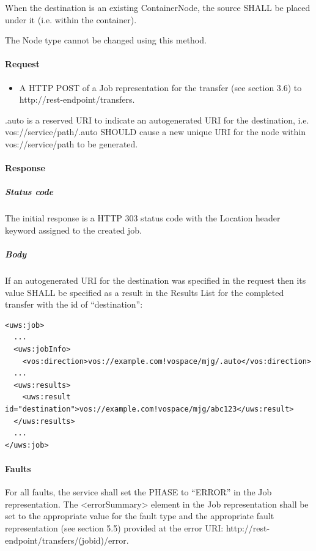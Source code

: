 \documentclass[11pt,a4paper]{ivoa}
\begin{document}
When the destination is an existing ContainerNode, the source SHALL be placed under it (i.e. within the container).

The Node type cannot be changed using this method.

\paragraph{Request}
\begin{itemize}
    \item A HTTP POST of a Job representation for the transfer (see section 3.6) to http://rest-endpoint/transfers.
\end{itemize}

.auto is a reserved URI to indicate an autogenerated URI for the destination, i.e. vos://service/path/.auto SHOULD cause a new unique URI for the node within vos://service/path to be generated.

\paragraph{Response}
\subparagraph{Status code} The initial response is a HTTP 303 status code with the Location header keyword assigned to the created job.
\subparagraph{Body}
If an autogenerated URI for the destination was specified in the request then its value SHALL be specified as a result in the Results List for the completed transfer with the id of ``destination'':
\begin{lstlisting}
<uws:job>
  ...
  <uws:jobInfo>
    <vos:direction>vos://example.com!vospace/mjg/.auto</vos:direction>
  ...
  <uws:results>
    <uws:result id="destination">vos://example.com!vospace/mjg/abc123</uws:result>
  </uws:results>
  ...
</uws:job>
\end{lstlisting}

\paragraph{Faults}

For all faults, the service shall set the PHASE to ``ERROR'' in the Job representation. The <errorSummary> element in the Job representation shall be set to the appropriate value for the fault type and the appropriate fault representation (see section 5.5) provided at the error URI: http://rest-endpoint/transfers/(jobid)/error.
\end{document}
